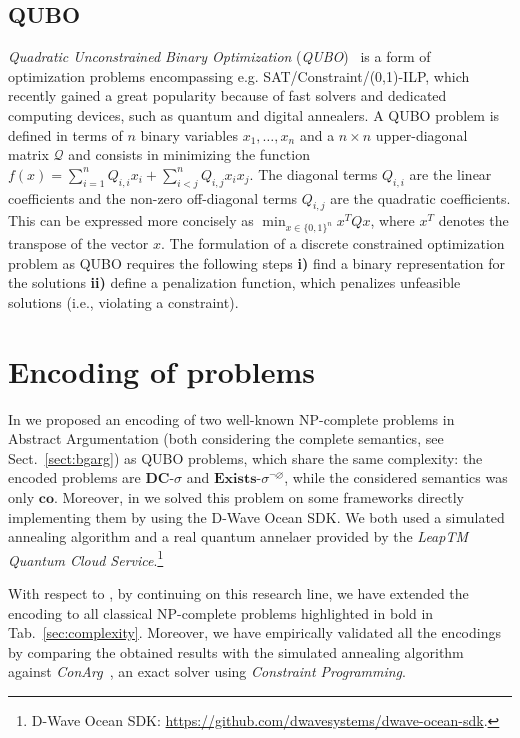 \documentclass[conference]{IEEEtran}
\newcommand{\co}{\mathbf{co}}
\newcommand{\dc}{\mathbf{DC}}
\begin{document}
\subsection{QUBO}\label{sect:qubo}
\emph{Quadratic Unconstrained Binary Optimization} (\emph{QUBO})~\cite{glover,glover2} is a
form of optimization problems encompassing e.g. SAT/Constraint/(0,1)-ILP, which  recently gained a great popularity because of fast solvers and dedicated computing devices, such as
quantum and digital annealers. 
A QUBO problem is defined in terms of $n$ binary variables $x_1,\dots,x_n$
and a $n\times n$ upper-diagonal matrix $\mathcal{Q}$ and consists in 
minimizing the function $f(x) = \sum_{i=1}^n Q_{i,i} x_i + \sum_{i < j}^n Q_{i,j} x_i x_j$.
The diagonal terms $Q_{i,i}$ are the linear coefficients and the non-zero off-diagonal terms $Q_{i,j}$
are the quadratic coefficients. This can be expressed more concisely as $\min_{x \in \{0,1\}^n} x^T Q x$, where $x^T$ denotes the transpose of the vector $x$. The formulation of a discrete constrained optimization problem as QUBO requires
the following steps {\bf i)}  find a binary representation for the solutions {\bf ii)}  define a penalization function, which penalizes unfeasible solutions (i.e., violating a constraint).

\section{Encoding of problems}\label{sect:encoding}
In \cite{pricai22} we proposed an encoding of two well-known NP-complete problems in Abstract Argumentation (both considering the complete semantics, see Sect.~\ref{sect:bgarg}) as QUBO problems, which share the same complexity: the encoded problems are  
$\dc\textit{-}\sigma$ and
$\mathit{\textbf{Exists}}\textit{-}\sigma^{\neg\varnothing}$, 
while the considered semantics was only $\co$.  
Moreover, in \cite{pricai22} we solved this problem on some frameworks directly  implementing them by using the D-Wave Ocean SDK. We both used a simulated annealing algorithm and a real quantum annelaer provided by the \emph{LeapTM Quantum Cloud Service}.\footnote{D-Wave Ocean SDK: \url{https://github.com/dwavesystems/dwave-ocean-sdk}.}

With respect to \cite{pricai22}, by continuing on this research line, we have extended the encoding to all classical NP-complete problems highlighted in bold in Tab.~\ref{sec:complexity}.
Moreover, we have empirically validated all the encodings by comparing the obtained results with the simulated annealing algorithm against \emph{ConArg}~\cite{conarg}, an exact solver using \emph{Constraint Programming}.
\end{document}
